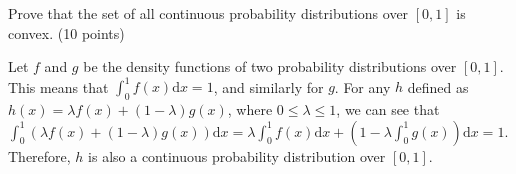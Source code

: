 \documentclass[fleqn]{homework}
\begin{document}
  \begin{problem}{4}
    \begin{question}
      Prove that the set of all continuous probability distributions over
      $[0,1]$ is convex. (10 points)
    \end{question}

    Let $f$ and $g$ be the density functions of two probability distributions
    over $[0,1]$.  This means that $\int_0^1 f(x) \mathrm{d}x = 1$, and
    similarly for $g$.  For any $h$ defined as
    $h(x) = \lambda f(x) + (1-\lambda) g(x)$, where $0 \leq \lambda \leq 1$, we
    can see that
    $\int_0^1 (\lambda f(x) + (1-\lambda)g(x)) \mathrm{d}x = \lambda\int_0^1
    f(x) \mathrm{d}x + (1-\lambda \int_0^1 g(x)) \mathrm{d}x = 1$.
    Therefore, $h$ is also a continuous probability distribution over $[0,1]$.
  \end{problem}
\end{document}
